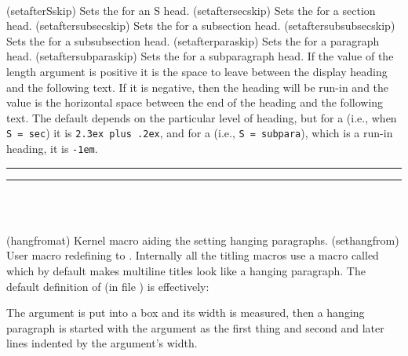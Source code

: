 \begin{syntax}
\cmd{\setafterSskip} \\
\end{syntax}
\glossary(setafterSskip)%
  {}%
  {Sets the  for an S head.}
\glossary(setaftersecskip)%
  {}%
  {Sets the  for a section head.}
\glossary(setaftersubsecskip)%
  {}%
  {Sets the  for a subsection head.}
\glossary(setaftersubsubsecskip)%
  {}%
  {Sets the  for a subsubsection head.}
\glossary(setafterparaskip)%
  {}%
  {Sets the  for a paragraph head.}
\glossary(setaftersubparaskip)%
  {}%
  {Sets the  for a subparagraph head.}
If the value of the  length argument is positive it is the space 
to leave between the display heading and the following text. If it is negative,
then the heading will be run-in and the value is the horizontal space
between the end of the heading and the following text.
The default  depends on the
particular level of heading, but for a \cmd{\section} (i.e., when 
\verb?S = sec?) it is \verb?2.3ex plus .2ex?, 
and for a \cmd{\subparagraph} (i.e., \verb?S = subpara?), which is a run-in 
heading, it is \verb?-1em?.

\fancybreak{$*$}
\fancybreak{}

\begin{syntax}
\cmd{\@hangfrom} \\
\cmd{\sethangfrom} \\
\end{syntax}
\glossary(hangfromat)%
  {}%
  {Kernel macro aiding the setting hanging paragraphs.}
\glossary(sethangfrom)%
  {}%
  {User macro redefining  to .}
Internally all the titling macros use a macro called \cmd{\@hangfrom} which
by default makes multiline titles look like a hanging paragraph. The
default definition of \cmd{\@hangfrom} (in file ) is
effectively:
\begin{lcode}
\newcommand{\@hangfrom}[1]{\setbox\@tempboxa\hbox{{#1}}%
  \hangindent \wd\@tempboxa\noindent\box\@tempboxa}
\end{lcode}
The argument is put into a box and its width is measured, then a hanging
paragraph is started with the argument as the 
first thing and second and later lines indented by the argument's width.

